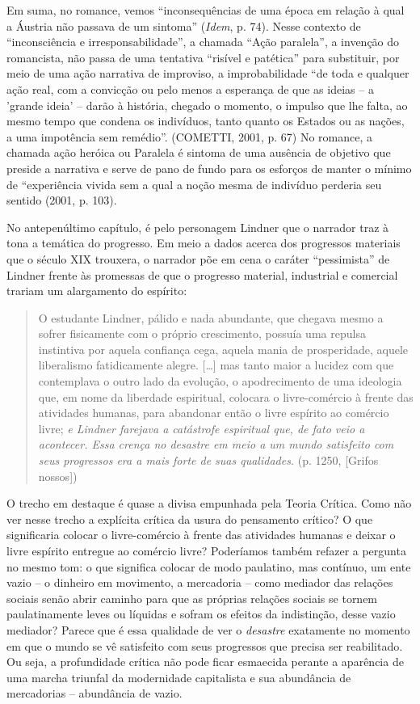 Em suma, no romance, vemos ``inconsequências de uma época em relação à
qual a Áustria não passava de um sintoma'' (\emph{Idem}, p. 74). Nesse
contexto de ``inconsciência e irresponsabilidade'', a chamada ``Ação
paralela'', a invenção do romancista, não passa de uma tentativa
``risível e patética'' para substituir, por meio de uma ação narrativa
de improviso, a improbabilidade ``de toda e qualquer ação real, com a
convicção ou pelo menos a esperança de que as ideias -- a 'grande ideia'
-- darão à história, chegado o momento, o impulso que lhe falta, ao
mesmo tempo que condena os indivíduos, tanto quanto os Estados ou as
nações, a uma impotência sem remédio''. (COMETTI, 2001, p. 67) No
romance, a chamada ação heróica ou Paralela é sintoma de uma ausência de
objetivo que preside a narrativa e serve de pano de fundo para os
esforços de manter o mínimo de ``experiência vivida sem a qual a noção
mesma de indivíduo perderia seu sentido (2001, p. 103).

No antepenúltimo capítulo, é pelo personagem Lindner que o narrador traz
à tona a temática do progresso. Em meio a dados acerca dos progressos
materiais que o século XIX trouxera, o narrador põe em cena o caráter
``pessimista'' de Lindner frente às promessas de que o progresso
material, industrial e comercial trariam um alargamento do espírito:

\begin{quote}
O estudante Lindner, pálido e nada abundante, que chegava mesmo a sofrer
fisicamente com o próprio crescimento, possuía uma repulsa instintiva
por aquela confiança cega, aquela mania de prosperidade, aquele
liberalismo fatidicamente alegre. {[}\ldots{}{]} mas tanto maior a
lucidez com que contemplava o outro lado da evolução, o apodrecimento de
uma ideologia que, em nome da liberdade espiritual, colocara o
livre-comércio à frente das atividades humanas, para abandonar então o
livre espírito ao comércio livre; \emph{e Lindner farejava a catástrofe
espiritual que, de fato veio a acontecer. Essa crença no desastre em
meio a um mundo satisfeito com seus progressos era a mais forte de suas
qualidades.} (p. 1250, {[}Grifos nossos{]})
\end{quote}

O trecho em destaque é quase a divisa empunhada pela Teoria Crítica.
Como não ver nesse trecho a explícita crítica da usura do pensamento
crítico? O que significaria colocar o livre-comércio à frente das
atividades humanas e deixar o livre espírito entregue ao comércio livre?
Poderíamos também refazer a pergunta no mesmo tom: o que significa
colocar de modo paulatino, mas contínuo, um ente vazio -- o dinheiro em
movimento, a mercadoria -- como mediador das relações sociais senão
abrir caminho para que as próprias relações sociais se tornem
paulatinamente leves ou líquidas e sofram os efeitos da indistinção,
desse vazio mediador? Parece que é essa qualidade de ver o
\emph{desastre} exatamente no momento em que o mundo se vê satisfeito
com seus progressos que precisa ser reabilitado. Ou seja, a profundidade
crítica não pode ficar esmaecida perante a aparência de uma marcha
triunfal da modernidade capitalista e sua abundância de mercadorias --
abundância de vazio.

